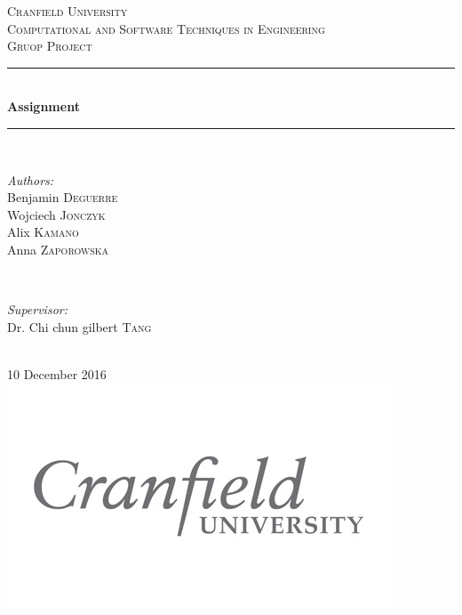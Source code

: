 \documentclass[10pt,a4paper]{article}
\numberwithin{equation}{section}
\begin{document}
	
	\begin{titlepage}
		
		\newcommand{\HRule}{\rule{\linewidth}{0.5mm}} %
		
		\center %
		
		\textsc{\LARGE Cranfield University}\\[1.5cm] %
		\textsc{\Large Computational and Software Techniques in Engineering}\\[0.5cm] %
		\textsc{\large Gruop Project}\\[0.5cm] %
		
		\HRule \\[0.4cm]
		{ \huge \bfseries Assignment}\\[0.4cm] %
		\HRule \\[1.5cm]
		
		\begin{minipage}{0.4\textwidth}
			\begin{flushleft} \large
				\emph{Authors:}\\
				Benjamin \textsc{Deguerre}\\
				Wojciech \textsc{Jonczyk}\\ %
				Alix \textsc{Kamano}\\
				Anna \textsc{Zaporowska}
			\end{flushleft}
		\end{minipage}
		~
		\begin{minipage}{0.4\textwidth}
			\begin{flushright} \large
				\emph{Supervisor:} \\
				Dr. Chi chun gilbert \textsc{Tang} %
			\end{flushright}
		\end{minipage}\\[2cm]
		
		{\large 10 December 2016}\\[3cm] %
		
		\includegraphics{logo}\\[2cm] %
		
		
		\vfill %
		
	\end{titlepage}

\tableofcontents

\newpage

\newpage

\newpage	

\newpage
\end{document}
